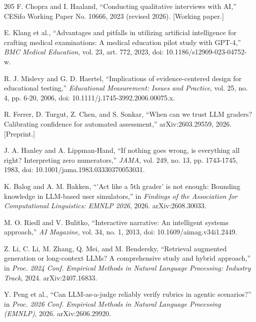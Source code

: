 \begin{thebibliography}{205}
 F. Chopra and I. Haaland, ``Conducting qualitative interviews with AI,'' CESifo Working Paper No. 10666, 2023 (revised 2026). [Working paper.]

 E. Klang et al., ``Advantages and pitfalls in utilizing artificial intelligence for crafting medical examinations: A medical education pilot study with GPT-4,'' \textit{BMC Medical Education}, vol. 23, art. 772, 2023, doi: 10.\allowbreak{}1186/\allowbreak{}s12909-\allowbreak{}023-\allowbreak{}04752-\allowbreak{}w.

 R. J. Mislevy and G. D. Haertel, ``Implications of evidence-\allowbreak{}centered design for educational testing,'' \textit{Educational Measurement: Issues and Practice}, vol. 25, no. 4, pp. 6-20, 2006, doi: 10.\allowbreak{}1111/\allowbreak{}j.\allowbreak{}1745-\allowbreak{}3992.\allowbreak{}2006.\allowbreak{}00075.\allowbreak{}x.

 R. Ferrer, D. Turgut, Z. Chen, and S. Sonkar, ``When can we trust LLM graders? Calibrating confidence for automated assessment,'' arXiv:2603.\allowbreak{}29559, 2026. [Preprint.]

 J. A. Hanley and A. Lippman-\allowbreak{}Hand, ``If nothing goes wrong, is everything all right? Interpreting zero numerators,'' \textit{JAMA}, vol. 249, no. 13, pp. 1743-1745, 1983, doi: 10.\allowbreak{}1001/\allowbreak{}jama.\allowbreak{}1983.\allowbreak{}03330370053031.

 K. Balog and A. M. Bakken, ``'Act like a 5th grader' is not enough: Bounding knowledge in LLM-based user simulators,'' in \textit{Findings of the Association for Computational Linguistics: EMNLP 2026}, 2026. arXiv:2608.\allowbreak{}30033.

 M. O. Riedl and V. Bulitko, ``Interactive narrative: An intelligent systems approach,'' \textit{AI Magazine}, vol. 34, no. 1, 2013, doi: 10.\allowbreak{}1609/\allowbreak{}aimag.\allowbreak{}v34i1.\allowbreak{}2449.

 Z. Li, C. Li, M. Zhang, Q. Mei, and M. Bendersky, ``Retrieval augmented generation or long-\allowbreak{}context LLMs? A comprehensive study and hybrid approach,'' in \textit{Proc. 2024 Conf. Empirical Methods in Natural Language Processing: Industry Track}, 2024. arXiv:2407.\allowbreak{}16833.

 Y. Peng et al., ``Can LLM-\allowbreak{}as-\allowbreak{}a-\allowbreak{}judge reliably verify rubrics in agentic scenarios?'' in \textit{Proc. 2026 Conf. Empirical Methods in Natural Language Processing (EMNLP)}, 2026. arXiv:2606.\allowbreak{}29920.


\end{thebibliography}
